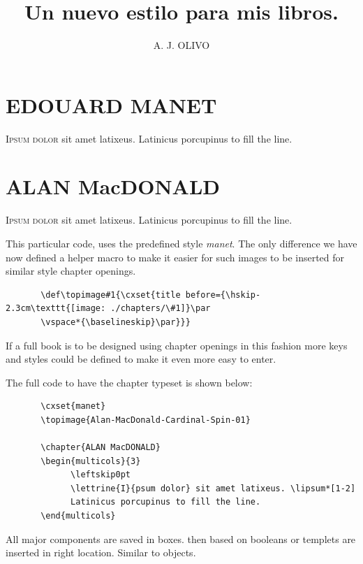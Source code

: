 \documentclass{book}
\author{A. J. OLIVO}
\title{\parindent0pt Un nuevo estilo para mis libros.}
\def\cxset{\pgfqkeys{/chapter}} %
\gdef\setdefaults{%
       \cxset{%
       name=CAP\'ITULO,
       title font-family=\rmfamily,
       title font-weight=\bfseries,
       title font-size=\Huge,
       title font-color=\color{purple},
       numbering=arabic,
       number dot=,
       number before=,
       number after=,
       chapter font-family=\sffamily,
       chapter font-weight=\bfseries,
       chapter font-size=\large,
       chapter spaceout=soul,
       chapter color=gray,
       chapter before={},%
       chapter after=,
       number position=rightname,
       number color=\color{gray},
       number after=\hspace{20pt},
       number before=\space,
       number font-size=\large,
       number font-family=\sffamily,
       number font-weight=\bfseries,
       title before=,
       title after=,
       title afterskip={\vskip24pt},
       title beforeskip={\vskip10pt},
       title font=\rmfamily,
       header style=plain,
       }
       }
\begin{document}
       \maketitle
       \dominitoc
       \tableofcontents
       \mainmatter
              \chapter{EDOUARD MANET}
       \begin{multicols}{3}
             \lettrine{I}{psum dolor} sit amet latixeus. \lipsum*[1-2]
             Latinicus porcupinus to fill the line.
       \end{multicols}


       
       \chapter{ALAN MacDONALD}
       \begin{multicols}{3}
             \lettrine{I}{psum dolor} sit amet latixeus. \lipsum*[1-2]
             Latinicus porcupinus to fill the line.
       \end{multicols}
       \clearpage

       This particular code, uses the predefined style \textit{manet}. The only difference we have now defined a helper macro to make it easier for such images to be inserted for similar style chapter openings.

       \medskip

       \begin{lstlisting}
       \def\topimage#1{\cxset{title before={\hskip-2.3cm\texttt{[image: ./chapters/\#1]}\par
       \vspace*{\baselineskip}\par}}}
       \end{lstlisting}

       If a full book is to be designed using chapter openings in this fashion more keys and styles could be defined to make it even more easy to enter.

       The full code to have the chapter typeset is shown below:
       \medskip

       \begin{lstlisting}
       \cxset{manet}
       \topimage{Alan-MacDonald-Cardinal-Spin-01}

       \chapter{ALAN MacDONALD}
       \begin{multicols}{3}
             \leftskip0pt
             \lettrine{I}{psum dolor} sit amet latixeus. \lipsum*[1-2]
             Latinicus porcupinus to fill the line.
       \end{multicols}
       \end{lstlisting}
       All major components are saved in boxes. then based on booleans or templets are inserted in right location. Similar to objects.
\end{document}
